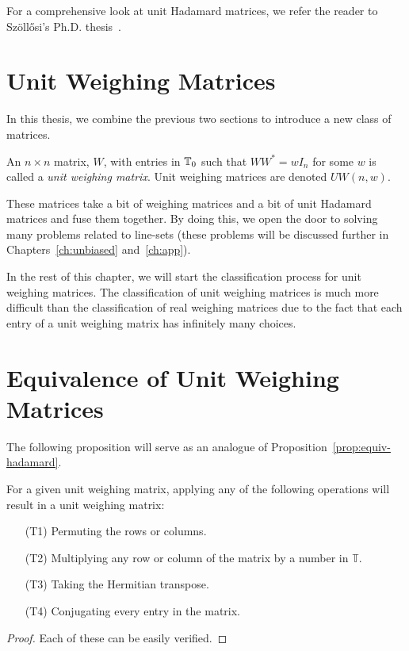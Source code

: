 For a comprehensive look at unit Hadamard matrices, we refer the reader to Sz\"oll\H{o}si's Ph.D. thesis~\cite{ferenc-thesis}.

\section[Unit Weighing Matrices]{Unit Weighing Matrices}
\label{sec:unit-weigh}

In this thesis, we combine the previous two sections to introduce a new class of matrices.

\begin{definition} \label{def:unit-weigh}
 An $n \times n$ matrix, $W$, with entries in $\mathbb{T}_{0}$ such that $WW^*=wI_n$ for some $w$ is called a {\it unit weighing matrix}. Unit weighing matrices are denoted $UW(n,w)$.
\end{definition}

These matrices take a bit of weighing matrices and a bit of unit Hadamard matrices and fuse them together. By doing this, we open the door to solving many problems related to line-sets (these problems will be discussed further in Chapters~\ref{ch:unbiased} and~\ref{ch:app}).

In the rest of this chapter, we will start the classification process for unit weighing matrices. The classification of unit weighing matrices is much more difficult than the classification of real weighing matrices due to the fact that each entry of a unit weighing matrix has infinitely many choices.

\section[Equivalence of Unit Weighing Matrices]{Equivalence of Unit Weighing Matrices}
\label{sec:equiv-weigh}

The following proposition will serve as an analogue of Proposition~\ref{prop:equiv-hadamard}.

\begin{proposition} \label{prop:equiv-ops}
For a given unit weighing matrix, applying any of the following operations will result in a unit weighing matrix:
\begin{enumerate}
 \item[(T1)] Permuting the rows or columns.
 \item[(T2)] Multiplying any row or column of the matrix by a number in  $\mathbb{T}$.
 \item[(T3)] Taking the Hermitian transpose.
 \item[(T4)] Conjugating every entry in the matrix.
\end{enumerate}

\begin{proof}
 Each of these can be easily verified.
\end{proof}

\end{proposition}

